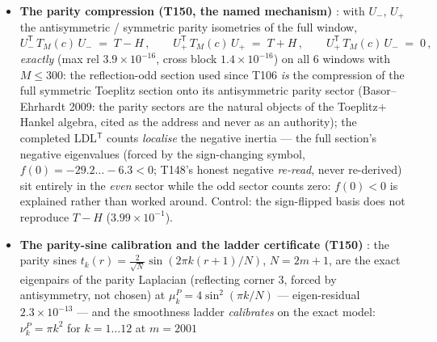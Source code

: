 \documentclass[11pt,a4paper]{article}
\begin{document}
\begin{itemize}[leftmargin=1.5em]
$c=c^{\mathrm{arch}}+c^{\mathrm{atom}}$ with $c^{\mathrm{atom}}\le0$ entrywise, and the
arithmetic mass carries the closed budget
$\|c^{\mathrm{atom}}\|_1\le\sum_j\mu_j\le4B\sqrt N$ with $B=1.038821$ the \emph{verified}
maximum of $\psi(n)/n$ over the whole atom table (Chebyshev 1852, computed and never assumed;
Abel summation carries the closed form). \emph{The honest negative as content}: the archimedean
section alone is \emph{indefinite} on $12/12$ windows (completed LDL$^{\mathsf T}$, up to $5$
negative eigenvalues) while the full section has zero --- the atoms are \emph{co-responsible}
for the positivity, so the additive perturbation reading (Weyl 1912 / Bauer--Fike 1960 /
Davis--Kahan 1970, cited, computed dead by T150 at $2.4$--$5.8$ orders, \emph{not} used) is
structurally empty and only the multiplicative / Loewner gauge step transfers. Control:
dropping the positive part in the zone formula breaks the identity ($4.25\times10^{-1}$).
\item \textbf{The parity compression (T150, the named mechanism)} \mE: with $U_-$, $U_+$ the
antisymmetric / symmetric parity isometries of the full window,
\[
U_-^{\mathsf T}\,T_M(c)\,U_-\;=\;T-H\,,\qquad
U_+^{\mathsf T}\,T_M(c)\,U_+\;=\;T+H\,,\qquad
U_+^{\mathsf T}\,T_M(c)\,U_-\;=\;0\,,
\]
\emph{exactly} (max rel $3.9\times10^{-16}$, cross block $1.4\times10^{-16}$) on all $6$
windows with $M\le300$: the reflection-odd section used since T106 \emph{is} the compression
of the full symmetric Toeplitz section onto its antisymmetric parity sector (Basor--Ehrhardt
2009: the parity sectors are the natural objects of the Toeplitz$+$Hankel algebra, cited as the
address and never as an authority); the completed LDL$^{\mathsf T}$ counts \emph{localise} the
negative inertia --- the full section's negative eigenvalues (forced by the sign-changing
symbol, $f(0)=-29.2\ldots-6.3<0$; T148's honest negative \emph{re-read}, never re-derived) sit
entirely in the \emph{even} sector while the odd sector counts zero: $f(0)<0$ is explained
rather than worked around. Control: the sign-flipped basis does not reproduce $T-H$
($3.99\times10^{-1}$).
\item \textbf{The parity-sine calibration and the ladder certificate (T150)} \mE: the parity
sines $t_k(r)=\tfrac{2}{\sqrt N}\sin(2\pi k(r{+}1)/N)$, $N=2m{+}1$, are the exact eigenpairs
of the parity Laplacian (reflecting corner $3$, forced by antisymmetry, not chosen) at
$\mu^P_k=4\sin^2(\pi k/N)$ --- eigen-residual $2.3\times10^{-13}$ --- and the smoothness
ladder \emph{calibrates} on the exact model: $\nu^P_k=\pi k^2$ for $k=1\ldots12$ at $m=2001$

\end{itemize}
\end{document}
